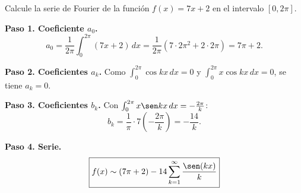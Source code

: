 \begin{prob}
Calcule la serie de Fourier de la función $f(x)=7x+2$ en el intervalo $[0,2\pi]$.
\begin{myproof}
\textbf{Paso 1. Coeficiente $a_0$.}
\[
a_0 = \frac{1}{2\pi}\int_0^{2\pi} (7x+2)\,dx = \frac{1}{2\pi}\left(7\cdot 2\pi^2 + 2\cdot 2\pi\right) = 7\pi + 2.
\]

\textbf{Paso 2. Coeficientes $a_k$.} Como $\int_0^{2\pi} \cos kx\,dx = 0$ y $\int_0^{2\pi} x\cos kx\,dx = 0$, se tiene $a_k = 0$.

\textbf{Paso 3. Coeficientes $b_k$.} Con $\int_0^{2\pi} x\sen kx\,dx = -\frac{2\pi}{k}$:
\[
b_k = \frac{1}{\pi}\cdot 7\left(-\frac{2\pi}{k}\right) = -\frac{14}{k}.
\]

\textbf{Paso 4. Serie.}
\[
\boxed{f(x) \sim (7\pi + 2) - 14 \sum_{k=1}^{\infty} \frac{\sen(kx)}{k}}
\]
\end{myproof}
\end{prob}

